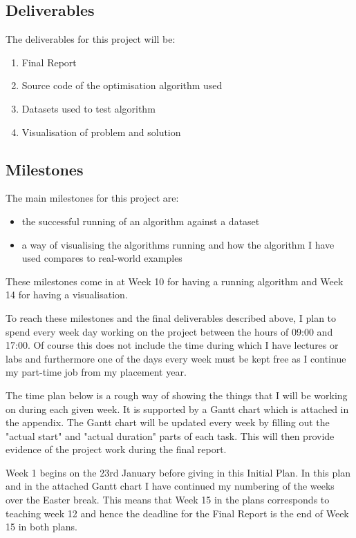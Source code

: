 \documentclass[12pt]{report}
\begin{document}
\subsection*{Deliverables}
The deliverables for this project will be:
\begin{enumerate}
\item Final Report
\item Source code of the optimisation algorithm used
\item Datasets used to test algorithm
\item Visualisation of problem and solution
\end{enumerate}

\subsection*{Milestones}
The main milestones for this project are: 

\begin{itemize}
\item the successful running of an algorithm against a dataset
\item a way of visualising the algorithms running and how the algorithm I have used compares to real-world examples
\end{itemize}
These milestones come in at Week 10 for having a running algorithm and Week 14 for having a visualisation.

To reach these milestones and the final deliverables described above, I plan to spend every week day working on the project between the hours of 09:00 and 17:00. Of course this does not include the time during which I have lectures or labs and furthermore one of the days every week must be kept free as I continue my part-time job from my placement year.

The time plan below is a rough way of showing the things that I will be working on during each given week. It is supported by a Gantt chart which is attached in the appendix. The Gantt chart will be updated every week by filling out the "actual start" and "actual duration" parts of each task. This will then provide evidence of the project work during the final report.

Week 1 begins on the 23rd January before giving in this Initial Plan. In this plan and in the attached Gantt chart I have continued my numbering of the weeks over the Easter break. This means that Week 15 in the plans corresponds to teaching week 12 and hence the deadline for the Final Report is the end of Week 15 in both plans.
\end{document}
